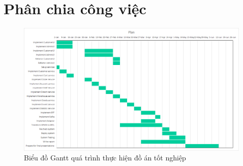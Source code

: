 \section{Phân chia công việc}
 {


  \begin{figure}[h]
	  \begin{center}
		  \includegraphics[width=14cm]{img/plan.png}
	  \end{center}
	  \caption{Biểu đồ Gantt quá trình thực hiện đồ án tốt nghiệp}
  \end{figure}


  \newpage

  \setlength\extrarowheight{6pt}
  \begin{longtable}{| p{2cm} | p{2cm} | p{10cm} |}


\end{longtable}}
